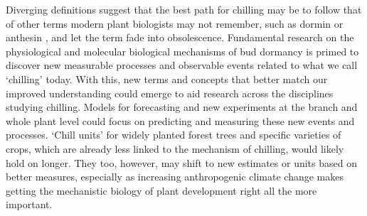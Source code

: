 \documentclass[11pt]{article}
\begin{document}
Diverging definitions suggest that the best path for chilling may be to follow that of other terms modern plant biologists may not remember, such as dormin or anthesin \citep[hypothesized compounds to induce dormancy and floral anthesis, respectively,][]{aksenova2006florigen,dorffling2015discovery}, and let the term fade into obsolescence. Fundamental research on the physiological and molecular biological mechanisms of bud dormancy is primed to discover new measurable processes and observable events related to what we call `chilling' today. With this, new terms and concepts that better match our improved understanding could emerge to aid research across the disciplines studying chilling. Models for forecasting and new experiments at the branch and whole plant level could focus on predicting and measuring these new events and processes. `Chill units'  for widely planted forest trees and specific varieties of crops, which are already less linked to the mechanism of chilling, would likely hold on longer. They too, however, may shift to new estimates or units based on better measures, especially as increasing anthropogenic climate change makes getting the mechanistic biology of plant development right all the more important. 


\clearpage

\end{document}
